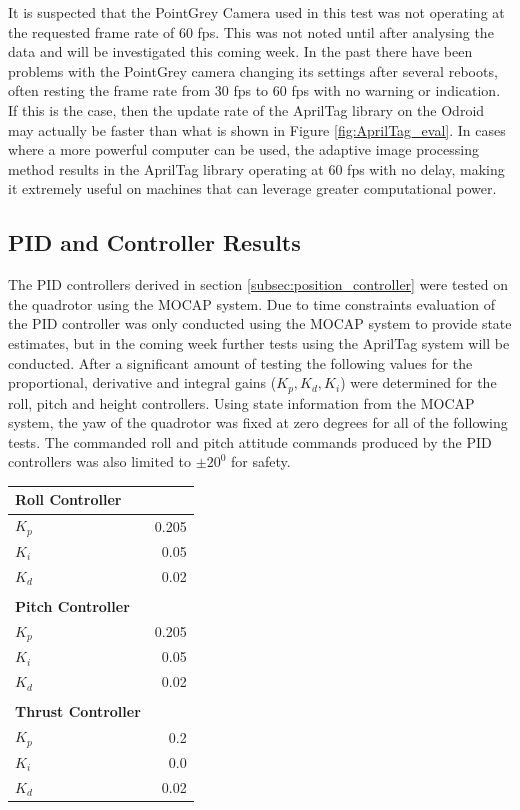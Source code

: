 \documentclass[11pt, twocolumn]{article}
\begin{document}
It is suspected that the PointGrey Camera used in this test was not operating at the requested frame rate of 60 fps. This was not noted until after analysing the data and will be investigated this coming week. In the past there have been problems with the PointGrey camera changing its settings after several reboots, often resting the frame rate from 30 fps to 60 fps with no warning or indication. If this is the case, then the update rate of the AprilTag library on the Odroid may actually be faster than what is shown in Figure \ref{fig:AprilTag_eval}. In cases where a more powerful computer can be used, the adaptive image processing method results in the AprilTag library operating at 60 fps with no delay, making it extremely useful on machines that can leverage greater computational power. 

\subsection{PID and Controller Results}
The PID controllers derived in section \ref{subsec:position_controller} were tested on the quadrotor using the MOCAP system. Due to time constraints evaluation of the PID controller was only conducted using the MOCAP system to provide state estimates, but in the coming week further tests using the AprilTag system will be conducted. After a significant amount of testing the following values for the proportional, derivative and integral gains ($K_p, K_d, K_i$) were determined for the roll, pitch and height controllers. Using state information from the MOCAP system, the yaw of the quadrotor was fixed at zero degrees for all of the following tests. The commanded roll and pitch attitude commands produced by the PID controllers was also limited to $\pm 20^0$ for safety. 

\begin{center} 
	\vspace{-0.4cm}
	\begin{tabular}{l r}
		\hline
		\textbf{Roll Controller} \\
		\hline
		$K_{p}$ &  0.205 \\
		$K_{i}$ & 0.05 \\
		$K_{d}$ &  0.02 \\
		\\
		\hline
		\textbf{Pitch Controller} \\
		\hline
		$K_{p}$ & 0.205 \\
		$K_{i}$ & 0.05 \\
		$K_{d}$ & 0.02 \\
		\\
		\hline
		\textbf{Thrust Controller} \\
		\hline
		$K_{p}$ & 0.2 \\
		$K_{i}$ & 0.0 \\
		$K_{d}$ & 0.02 \\
	\end{tabular}
\end{center}
\end{document}
